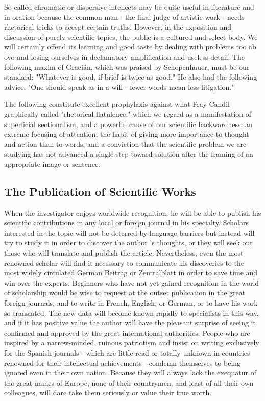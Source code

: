 \documentclass{article}
\begin{document}
So-called chromatic or dispersive intellects may be quite useful in literature and in oration because the common man - the final judge of artistic work - needs rhetorical tricks to accept certain truths. However, in the exposition and discussion of purely scientific topics, the public is a cultured and select body. We will certainly offend its learning and good taste by dealing with problems too ab ovo and losing ourselves in declamatory amplification and useless detail. The following maxim of Gracián, which was praised by Schopenhauer, must be our standard: "Whatever is good, if brief is twice as good." He also had the following advice: "One should speak as in a will - fewer words mean less litigation."

The following constitute excellent prophylaxis against what Fray Candil graphically called "rhetorical flatulence," which we regard as a manifestation of superficial sectionalism, and a powerful cause of our scientific backwardness: an extreme focusing of attention, the habit of giving more importance to thought and action than to words, and a conviction that the scientific problem we are studying has not advanced a single step toward solution after the framing of an appropriate image or sentence.

\subsection*{The Publication of Scientific Works}

When the investigator enjoys worldwide recognition, he will be able to publish his scientific contributions in any local or foreign journal in his specialty. Scholars interested in the topic will not be deterred by language barriers but instead will try to study it in order to discover the author ’s thoughts, or they will seek out those who will translate and publish the article. Nevertheless, even the most renowned scholar will find it necessary to communicate his discoveries to the most widely circulated German Beitrag or Zentralblatt in order to save time and win over the experts. Beginners who have not yet gained recognition in the world of scholarship would be wise to request at the outset publication in the great foreign journals, and to write in French, English, or German, or to have his work so translated. The new data will become known rapidly to specialists in this way, and if it has positive value the author will have the pleasant surprise of seeing it confirmed and approved by the great international authorities. People who are inspired by a narrow-minded, ruinous patriotism and insist on writing exclusively for the Spanish journals - which are little read or totally unknown in countries renowned for their intellectual achievements - condemn themselves to being ignored even in their own nation. Because they will always lack the exequatur of the great names of Europe, none of their countrymen, and least of all their own colleagues, will dare take them seriously or value their true worth.
\end{document}
